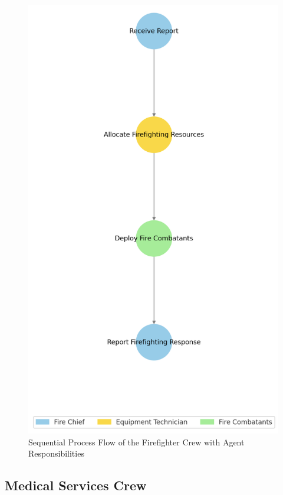 \begin{figure}[ht!]
	\centering
	\includegraphics[height=0.59\textheight]{figures/Firefighter_Crew_Flow.png}
	\caption{Sequential Process Flow of the Firefighter Crew with Agent Responsibilities}
	\label{fig:firefighter_flow}
\end{figure}

\subsection{Medical Services Crew}

